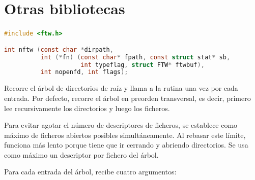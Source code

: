 \chapter{Otras bibliotecas}

\subsection{}\label{ntfw}

\begin{lstlisting}[language=C]
#include <ftw.h>

int nftw (const char *dirpath,
          int (*fn) (const char* fpath, const struct stat* sb,
                     int typeflag, struct FTW* ftwbuf),
          int nopenfd, int flags);
\end{lstlisting}

Recorre el árbol de directorios de raíz  y llama a la rutina  una vez por cada entrada.
Por defecto, recorre el árbol en preorden transversal, es decir, primero lee recursivamente los directorios y luego los ficheros.

Para evitar agotar el número de descriptores de ficheros, se establece  como máximo de ficheros abiertos posibles simultáneamente.
Al rebasar este límite,  funciona más lento porque tiene que ir cerrando y abriendo directorios.
Se usa como máximo un descriptor por fichero del árbol.

Para cada entrada del árbol,  recibe cuatro argumentos:

